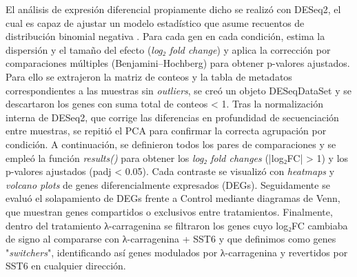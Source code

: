 \documentclass[10pt,a4paper]{article}
\begin{document}
El análisis de expresión diferencial propiamente dicho se realizó con DESeq2, el cual es capaz de ajustar un modelo estadístico que asume recuentos de distribución binomial negativa \parencite{Love2014}. Para cada gen en cada condición, estima la dispersión y el tamaño del efecto (\textit{log₂ fold change}) y aplica la corrección por comparaciones múltiples (Benjamini–Hochberg) para obtener p-valores ajustados. Para ello se extrajeron la matriz de conteos y la tabla de metadatos correspondientes a las muestras sin \textit{outliers}, se creó un objeto DESeqDataSet y se descartaron los genes con suma total de conteos < 1. Tras la normalización interna de DESeq2, que corrige las diferencias en profundidad de secuenciación entre muestras, se repitió el PCA para confirmar la correcta agrupación por condición. A continuación, se definieron todos los pares de comparaciones y se empleó la función \textit{results()} para obtener los \textit{log₂ fold changes} (|log₂FC| > 1) y los p-valores ajustados (padj < 0.05). Cada contraste se visualizó con \textit{heatmaps} y \textit{volcano plots} de genes diferencialmente expresados (DEGs). Seguidamente se evaluó el solapamiento de DEGs frente a Control mediante diagramas de Venn, que muestran genes compartidos o exclusivos entre tratamientos. Finalmente, dentro del tratamiento λ-carragenina se filtraron los genes cuyo log₂FC cambiaba de signo al compararse con λ-carragenina + SST6 y que definimos como genes "\textit{switchers}", identificando así genes modulados por λ-carragenina y revertidos por SST6 en cualquier dirección.
\end{document}
